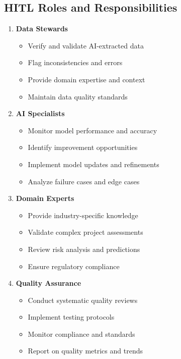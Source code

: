 \documentclass[business]{../templates/infraradar-main}
\begin{document}
\subsection{HITL Roles and Responsibilities}
\begin{enumerate}
    \item \textbf{Data Stewards}
    \begin{itemize}
        \item Verify and validate AI-extracted data
        \item Flag inconsistencies and errors
        \item Provide domain expertise and context
        \item Maintain data quality standards
    \end{itemize}
    
    \item \textbf{AI Specialists}
    \begin{itemize}
        \item Monitor model performance and accuracy
        \item Identify improvement opportunities
        \item Implement model updates and refinements
        \item Analyze failure cases and edge cases
    \end{itemize}
    
    \item \textbf{Domain Experts}
    \begin{itemize}
        \item Provide industry-specific knowledge
        \item Validate complex project assessments
        \item Review risk analysis and predictions
        \item Ensure regulatory compliance
    \end{itemize}
    
    \item \textbf{Quality Assurance}
    \begin{itemize}
        \item Conduct systematic quality reviews
        \item Implement testing protocols
        \item Monitor compliance and standards
        \item Report on quality metrics and trends
    \end{itemize}
\end{enumerate}
\end{document}
